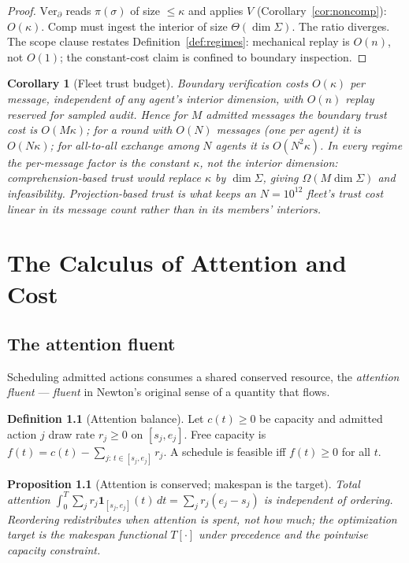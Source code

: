 \documentclass[11pt,oneside]{book}
\theoremstyle{definition}
\newtheorem{definition}{Definition}[chapter]
\theoremstyle{plain}
\newtheorem{proposition}[theorem]{Proposition}
\newtheorem{corollary}[theorem]{Corollary}
\theoremstyle{remark}
\newcommand{\Proj}{\pi}                        %
\newcommand{\CL}{\kappa}                       %
\begin{document}
\begin{proof}
$\mathrm{Ver}_\partial$ reads $\Proj(\sigma)$ of size $\le\CL$ and applies $V$
(Corollary~\ref{cor:noncomp}): $O(\CL)$. $\mathrm{Comp}$ must ingest the interior of size
$\Theta(\dim\Sigma)$. The ratio diverges. The scope clause restates
Definition~\ref{def:regimes}: mechanical replay is $O(n)$, not $O(1)$; the constant-cost claim
is confined to boundary inspection. \end{proof}

\begin{corollary}[Fleet trust budget]
Boundary verification costs $O(\CL)$ per message, independent of any agent's interior
dimension, with $O(n)$ replay reserved for sampled audit. Hence for $M$ admitted messages the
boundary trust cost is $O(M\CL)$; for a round with $O(N)$ messages (one per agent) it is
$O(N\CL)$; for all-to-all exchange among $N$ agents it is $O(N^2\CL)$. In every regime the
per-message factor is the constant $\CL$, not the interior dimension: comprehension-based trust
would replace $\CL$ by $\dim\Sigma$, giving $\Omega(M\dim\Sigma)$ and infeasibility.
Projection-based trust is what keeps an $N=10^{12}$ fleet's trust cost linear in its message
count rather than in its members' interiors.
\end{corollary}

\chapter{The Calculus of Attention and Cost}
\label{ch:calc}

\section{The attention fluent}

Scheduling admitted actions consumes a shared conserved resource, the \emph{attention fluent}
--- \emph{fluent} in Newton's original sense of a quantity that flows.

\begin{definition}[Attention balance]\label{def:attnbalance}
Let $c(t)\ge0$ be capacity and admitted action $j$ draw rate $r_j\ge0$ on $[s_j,e_j]$. Free
capacity is $f(t)=c(t)-\sum_{j:\,t\in[s_j,e_j]}r_j$. A schedule is feasible iff $f(t)\ge0$
for all $t$.
\end{definition}

\begin{proposition}[Attention is conserved; makespan is the target]\label{prop:attnconservation}
Total attention $\int_0^T\!\sum_j r_j\mathbf 1_{[s_j,e_j]}(t)\,dt=\sum_j r_j(e_j-s_j)$ is
independent of ordering. Reordering redistributes \emph{when} attention is spent, not \emph{how
much}; the optimization target is the makespan functional $T[\cdot]$ under precedence and the
pointwise capacity constraint.
\end{proposition}
\end{document}
